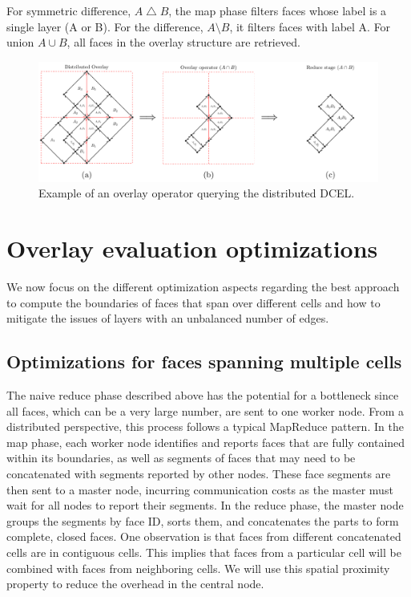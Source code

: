 For symmetric difference, $A \bigtriangleup B$, the map phase filters faces whose label is a single layer (A or B). For the difference, $A \setminus B$, it 
filters faces with label A. For union $A \cup B$, all faces in the overlay structure are retrieved. 

\begin{figure}
    \centering
    \includegraphics[width=\linewidth]{chapterSDCEL/overlay_operator/overlay_operator}
    \caption{Example of an overlay operator querying the distributed DCEL.} \label{fig:overlay_operator}
\end{figure}

\section{Overlay evaluation optimizations}\label{sec:alternative_methods}
We now focus on the different optimization aspects regarding the best approach to compute the boundaries of faces that span over different cells and how to mitigate the issues of layers with an unbalanced number of edges.

\subsection{Optimizations for faces spanning multiple cells}\label{sec:optimizing}

The naive reduce phase described above has the potential for a bottleneck since all faces, which can be a very large number, are sent to one worker node. From a distributed perspective, this process follows a typical MapReduce pattern. In the map phase, each worker node identifies and reports faces that are fully contained within its boundaries, as well as segments of faces that may need to be concatenated with segments reported by other nodes. These face segments are then sent to a master node, incurring communication costs as the master must wait for all nodes to report their segments. In the reduce phase, the master node groups the segments by face ID, sorts them, and concatenates the parts to form complete, closed faces.  One observation is that faces from different concatenated cells are in contiguous cells. This implies that faces from a particular cell will be combined with faces from neighboring cells. We will use this spatial proximity property to reduce the overhead in the central node.

